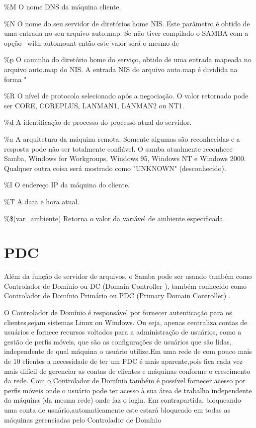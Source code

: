 \%M
O nome DNS da máquina cliente.

\%N
O nome do seu servidor de diretórios home NIS. Este parâmetro é obtido de uma entrada no seu arquivo auto.map. Se não tiver compilado o SAMBA com a opção --with-automount então este valor será o mesmo de %

\%p
O caminho do diretório home do serviço, obtido de uma entrada mapeada no arquivo auto.map do NIS. A entrada NIS do arquivo auto.map é dividida na forma "%

\%R
O nível de protocolo selecionado após a negociação. O valor retornado pode ser CORE, COREPLUS, LANMAN1, LANMAN2 ou NT1.

\%d
A identificação de processo do processo atual do servidor.

\%a
A arquitetura da máquina remota. Somente algumas são reconhecidas e a resposta pode não ser totalmente confiável. O samba atualmente reconhece Samba, Windows for Workgroups, Windows 95, Windows NT e Windows 2000. Qualquer outra coisa será mostrado como "UNKNOWN" (desconhecido).

\%I
O endereço IP da máquina do cliente.

\%T
A data e hora atual.

\%\$(var\_ambiente)
Retorna o valor da variável de ambiente especificada.

\section{PDC}

Além da função de servidor de arquivos, o Samba pode ser usando também como Controlador de Domínio ou DC (Domain Controller 
), também conhecido como Controlador de Domínio Primário ou PDC (Primary Domain Controller) \cite{MORIMOTO}.

O Controlador de Domínio é responsável por fornecer autenticação para os clientes,sejam sistemas Linux ou Windows. Ou seja, apenas centraliza contas de usuários e fornece recursos voltados para a administração de usuários, como a gestão de perfis móveis, que são as configurações de usuários que são lidas, independente de qual máquina o usuário utilize.Em uma rede de com pouco mais de 10 clientes a necessidade de ter um PDC é mais aparente,pois fica cada vez mais difícil de gerenciar as contas de clientes e máquinas conforme o crescimento da rede. Com o Controlador de Domínio também é possível fornecer acesso por perfis móveis onde o usuário pode ter acesso à sua área de trabalho independente da máquina (da mesma rede) onde faz o login. Em contrapartida, bloqueando uma conta de usuário,automaticamente este estará bloqueado em todas as máquinas gerenciadas pelo Controlador de Domínio \cite{MORIMOTO}

